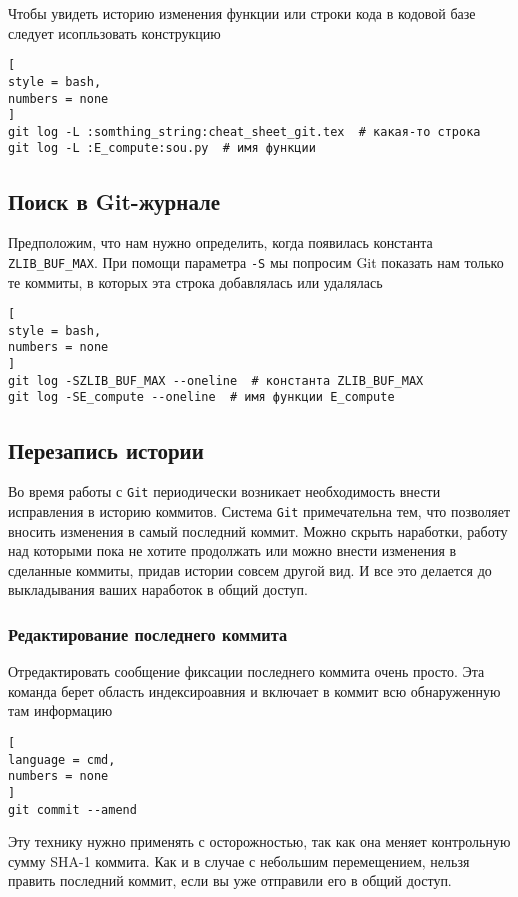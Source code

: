 \documentclass[%
	11pt,
	a4paper,
	utf8,
		]{article}
\begin{document}
Чтобы увидеть историю изменения функции или строки кода в кодовой базе следует исопльзовать конструкцию

\begin{lstlisting}[
style = bash,
numbers = none
]
git log -L :somthing_string:cheat_sheet_git.tex  # какая-то строка
git log -L :E_compute:sou.py  # имя функции
\end{lstlisting}

\subsection{Поиск в Git-журнале}

Предположим, что нам нужно определить, когда появилась константа \texttt{ZLIB\_BUF\_MAX}. При помощи параметра \verb|-S| мы попросим Git показать нам только те коммиты, в которых эта строка добавлялась или удалялась
\begin{lstlisting}[
style = bash,
numbers = none
]
git log -SZLIB_BUF_MAX --oneline  # константа ZLIB_BUF_MAX
git log -SE_compute --oneline  # имя функции E_compute
\end{lstlisting}

\subsection{Перезапись истории}

Во время работы с \texttt{Git} периодически возникает необходимость внести исправления в историю коммитов. Система \texttt{Git} примечательна тем, что позволяет вносить изменения в самый последний коммит. Можно скрыть наработки, работу над которыми пока не хотите продолжать или можно внести изменения в сделанные коммиты, придав истории совсем другой вид. И все это делается до выкладывания ваших наработок в общий доступ.

\subsubsection{Редактирование последнего коммита}

Отредактировать сообщение фиксации последнего коммита очень просто. Эта команда берет область индексироавния и включает в коммит всю обнаруженную там информацию

\begin{lstlisting}[
language = cmd,
numbers = none
]
git commit --amend
\end{lstlisting}

Эту технику нужно применять с осторожностью, так как она меняет контрольную сумму SHA-1 коммита. Как и в случае с небольшим перемещением, нельзя править последний коммит, если вы уже отправили его в общий доступ.
\end{document}
